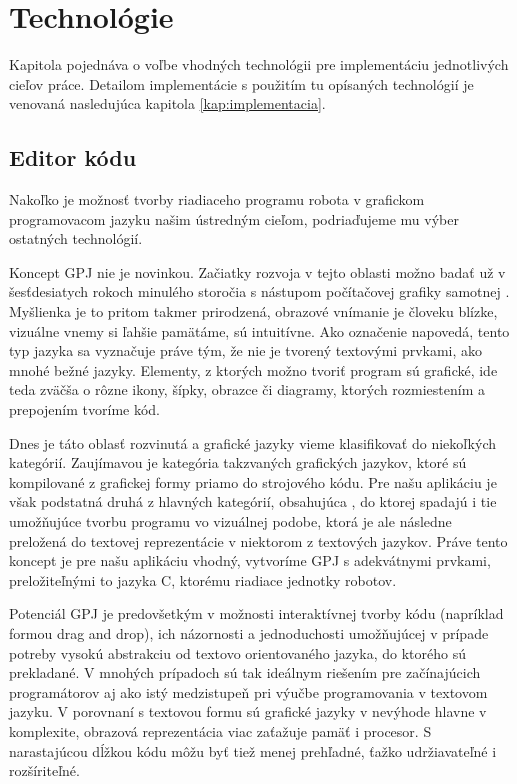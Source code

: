 \chapter{Technológie}
\label{kap:technologie}

Kapitola pojednáva o voľbe vhodných technológii pre implementáciu jednotlivých cieľov práce. Detailom implementácie s použitím tu opísaných technológií je venovaná nasledujúca kapitola \ref{kap:implementacia}.

\section{Editor kódu}
\label{kap:GrafickyProgramovaciJayzk}
Nakoľko je možnosť tvorby riadiaceho programu robota v grafickom programovacom jazyku našim ústredným cieľom, podriaďujeme mu výber ostatných technológií.

Koncept GPJ nie je novinkou. Začiatky rozvoja v tejto oblasti možno badať už v šesťdesiatych rokoch minulého storočia s nástupom počítačovej grafiky samotnej \cite{boshernitsan2004visual}. Myšlienka je to pritom takmer prirodzená, obrazové vnímanie je človeku blízke, vizuálne vnemy si ľahšie pamätáme, sú intuitívne. Ako označenie napovedá, tento typ jazyka sa vyznačuje práve tým, že nie je tvorený textovými prvkami, ako mnohé bežné jazyky. Elementy, z ktorých možno tvoriť program sú grafické, ide teda zväčša o rôzne ikony, šípky, obrazce či diagramy, ktorých rozmiestením a prepojením tvoríme kód.

Dnes je táto oblasť rozvinutá a grafické jazyky vieme klasifikovať do niekoľkých kategórií. Zaujímavou je kategória takzvaných  grafických jazykov, ktoré sú kompilované z grafickej formy priamo do strojového kódu. Pre našu aplikáciu je však podstatná druhá z hlavných kategórií, obsahujúca , do ktorej spadajú i tie umožňujúce tvorbu programu vo vizuálnej podobe, ktorá je ale následne preložená do textovej reprezentácie v niektorom z textových jazykov. Práve tento koncept je pre našu aplikáciu vhodný, vytvoríme GPJ s adekvátnymi prvkami, preložiteľnými to jazyka C, ktorému  riadiace jednotky robotov.

Potenciál GPJ je predovšetkým v možnosti interaktívnej tvorby kódu (napríklad formou drag and drop), ich názornosti a jednoduchosti umožňujúcej v prípade potreby vysokú abstrakciu od textovo orientovaného jazyka, do ktorého sú prekladané. V mnohých prípadoch sú tak ideálnym riešením pre začínajúcich programátorov aj ako istý medzistupeň pri výučbe programovania v textovom jazyku. V porovnaní s textovou formu sú grafické jazyky v nevýhode hlavne v komplexite, obrazová reprezentácia viac zaťažuje pamäť i procesor. S narastajúcou dĺžkou kódu môžu byť tiež menej prehľadné, ťažko udržiavateľné i rozšíriteľné.

